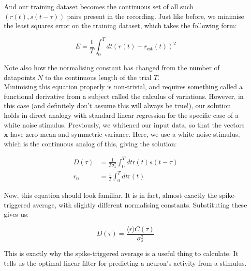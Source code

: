 \documentclass{article}
\begin{document}
And our training dataset becomes the continuous set of all such $(r(t), s(t-\tau))$ pairs present in the recording. Just like before, we minimise the least squares error on the training dataset, which takes the following form:

\begin{equation*}
    E = \frac{1}{T} \int_0^T dt (r(t) - r_{\text{est}}(t))^2
\end{equation*}

Note also how the normalising constant has changed from the number of datapoints $N$ to the continuous length of the trial $T$.\\

Minimising this equation properly is non-trivial, and requires something called a functional derivative from a subject called the calculus of variations. However, in this case (and definitely don't assume this will always be true!), our solution holds in direct analogy with standard linear regression for the specific case of a white noise stimulus. Previously, we whitened our input data, so that the vectors $\bm{x}$ have zero mean and symmetric variance. Here, we use a white-noise stimulus, which is the continuous analog of this, giving the solution:

\begin{align*}
    D(\tau) &= \frac{1}{T\sigma_s^2} \int_0^T dt \text{r}(t) s(t-\tau)\\
    r_0 &= \frac{1}{T} \int_0^T dt \text{r}(t)
\end{align*}

Now, this equation should look familiar. It is in fact, almost exactly the spike-triggered average, with slightly different normalising constants. Substituting these gives us:

\begin{equation*}
    D(\tau) = \frac{\langle r \rangle C(\tau)}{\sigma_s^2}
\end{equation*}

This is exactly why the spike-triggered average is a useful thing to calculate. It tells us the optimal linear filter for predicting a neuron's activity from a stimulus.\\
\end{document}
